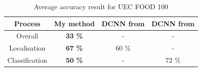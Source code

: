 
\begin{table}
    \centering
    \renewcommand{\arraystretch}{1.2}
    \begin{tabulary}{\textwidth}{| C | C c c|} 
        \hline
        Process & My method & DCNN from \cite{Shimoda2015} & DCNN from  \cite{Kawano2014} \\
        \hline
        Overall & \textbf{33 \%} & - & - \\ 
        \hline
        Localisation &  \textbf{67 \%} & 60 \% & - \\
        \hline
        Classification &  \textbf{50 \%} & -  & 72 \% \\
        \hline
    \end{tabulary}
    \caption{Average accuracy result for UEC FOOD 100}
\end{table}
